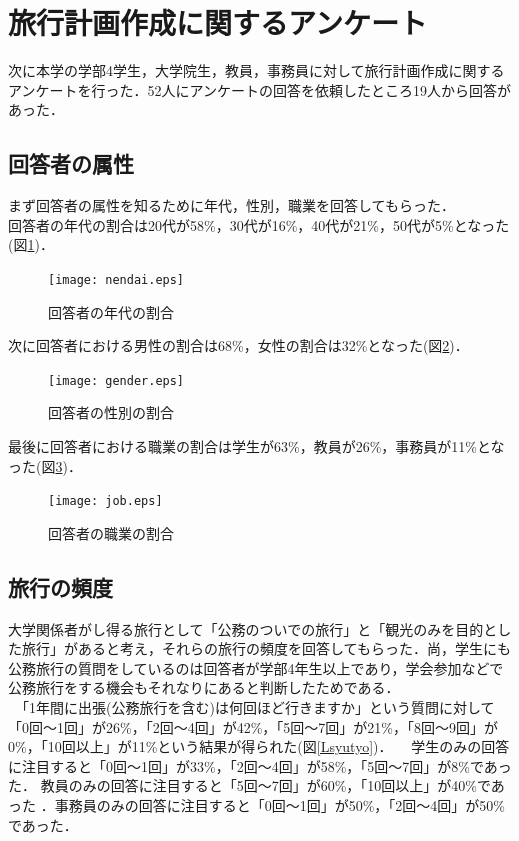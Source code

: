 \documentclass{funthesis}
\begin{document}
\section{旅行計画作成に関するアンケート}
次に本学の学部4学生，大学院生，教員，事務員に対して旅行計画作成に関するアンケートを行った．52人にアンケートの回答を依頼したところ19人から回答があった．\\


\subsection{回答者の属性}

まず回答者の属性を知るために年代，性別，職業を回答してもらった．\\
回答者の年代の割合は20代が58\%，30代が16\%，40代が21\%，50代が5\%となった(図\ref{Lnendai})．

\begin{figure}[htpb]
\begin{center}
\texttt{[image: nendai.eps]}
\end{center}
\caption{回答者の年代の割合}
\label{Lnendai}
\end{figure}

次に回答者における男性の割合は68\%，女性の割合は32\%となった(図\ref{Lgender})．

\begin{figure}[htpb]
\begin{center}
\texttt{[image: gender.eps]}
\end{center}
\caption{回答者の性別の割合}
\label{Lgender}
\end{figure}


最後に回答者における職業の割合は学生が63\%，教員が26\%，事務員が11\%となった(図\ref{Ljob})．

\begin{figure}[htpb]
\begin{center}
\texttt{[image: job.eps]}
\end{center}
\caption{回答者の職業の割合}
\label{Ljob}
\end{figure}


\subsection{旅行の頻度}

大学関係者がし得る旅行として「公務のついでの旅行」と「観光のみを目的とした旅行」があると考え，それらの旅行の頻度を回答してもらった．尚，学生にも公務旅行の質問をしているのは回答者が学部4年生以上であり，学会参加などで公務旅行をする機会もそれなりにあると判断したためである．\\
　「1年間に出張(公務旅行を含む)は何回ほど行きますか」という質問に対して「0回〜1回」が26\%，「2回〜4回」が42\%，「5回〜7回」が21\%，「8回〜9回」が0\%，「10回以上」が11\%という結果が得られた(図\ref{Lsyutyo})．
　学生のみの回答に注目すると「0回〜1回」が33\%，「2回〜4回」が58\%，「5回〜7回」が8\%であった．
教員のみの回答に注目すると「5回〜7回」が60\%，「10回以上」が40\%であった
．事務員のみの回答に注目すると「0回〜1回」が50\%，「2回〜4回」が50\%であった．
\end{document}
